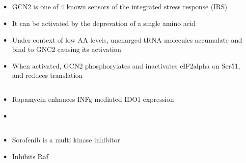 \documentclass{article}
\begin{document}
    \subsection{\cite{xia2018gcn2}}
    \begin{itemize}
        \item GCN2 is one of 4 known sensors of the integrated stress response (IRS)
        \item It can be activated by the deprevation of a single amino acid
        \item Under context of low AA levels, uncharged tRNA molecules accumulate and bind to GNC2 causing its activation
        \item When activated, GCN2 phosphorylates and inactivates eIF2alpha on Ser51, and reduces translation
    \end{itemize}

    \subsection{\cite{folgiero2016ido1}}
    \begin{itemize}
        \item Rapamycin enhances INFg mediated IDO1 expression
        \item
    \end{itemize}

    \subsection{\cite{fumarola2013effects}}
    \begin{itemize}
        \item Sorafenib is a multi kinase inhibitor
        \item Inhibits Raf
    \end{itemize}
\end{document}
